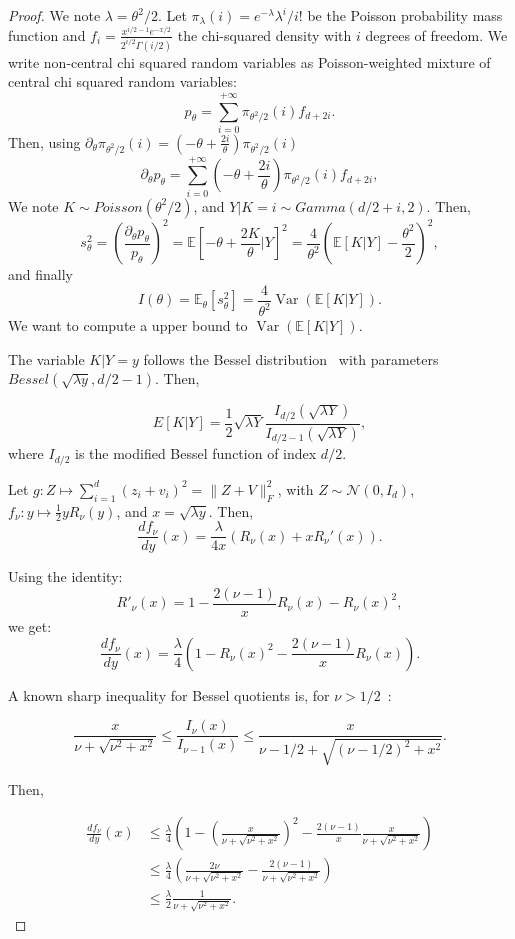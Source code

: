 \documentclass{article}
\theoremstyle{plain}
\theoremstyle{definition}
\theoremstyle{remark}
\DeclareMathOperator{\Var}{Var}
\begin{document}
\begin{proof}
    We note $\lambda = \theta^2/2$.
    Let $\pi_\lambda(i) = e^{-\lambda} \lambda^i /i!$ be the Poisson probability mass function and $f_i = \frac{x^{i/2-1} e^{-x/2}}{2^{i/2}\Gamma(i/2)}$ the chi-squared density with $i$ degrees of freedom.
    We write non-central chi squared random variables as Poisson-weighted mixture of central chi squared random variables: \[p_\theta = \sum_{i=0}^{+\infty} \pi_{\theta^2/2}(i)f_{d+2i}.\]
    Then, using $\partial_\theta \pi_{\theta^2/2}(i)= (- \theta  + \frac{2 i}{\theta} )  \pi_{\theta^2/2}(i)$
    \[\partial_\theta p_\theta = \sum_{i=0}^{+\infty} \left(- \theta  + \frac{2 i}{\theta} \right)\pi_{\theta^2/2}(i)f_{d+2i},\]
    We note $K \sim Poisson(\theta^2/2)$, and $Y | K=i\sim Gamma(d/2 + i, 2)$. Then,\[s_\theta^2 = \left(\frac{\partial_\theta p_\theta}{p_\theta}\right)^2 =\mathbb{E}\left[ -\theta + \frac{2K}{\theta} \bigg | Y \right]^2 = \frac{4}{\theta^2}\left(\mathbb{E}[K | Y] - \frac{\theta^2}{2}\right)^2,\]
    and finally
    \[I(\theta) = \mathbb{E}_\theta\left[s_\theta^2\right] = \frac{4}{\theta^2}\Var\left(\mathbb{E}[K|Y]\right).\]
    We want to compute a upper bound to $\Var(\mathbb{E}[K|Y])$. 

    The variable $K|Y = y$ follows the Bessel distribution~\citep{Yuan2000} with parameters $Bessel(\sqrt{\lambda y},d/2 -1)$. Then,

\[E[K|Y] = \frac{1}{2} \sqrt{\lambda Y} \frac{I_{d/2}(\sqrt{\lambda Y})}{I_{d/2-1}(\sqrt{\lambda Y})},\]
where $I_{d/2}$ is the modified Bessel function of index $d/2$.

Let $g : Z \mapsto \sum_{i=1}^d (z_i + v_i)^2 = \|Z+V\|_F^2$, with $Z \sim \mathcal{N}(0, I_d)$, $f_\nu : y \mapsto \frac{1}{2}yR_\nu(y)$, and $x = \sqrt{\lambda y}$. Then, \[\frac{df_\nu}{dy}(x) = \frac{\lambda}{4x}\left(R_\nu(x) + x R_\nu'(x)\right).\]

Using the identity:
\[R'_\nu(x)=1 - \frac{2(\nu-1)}{x}R_\nu(x) - R_\nu(x)^2,\]
we get:
\[\frac{df_\nu}{dy}(x) = \frac{\lambda}{4}\left(1- R_\nu(x)^2 - \frac{2(\nu-1)}{x}R_\nu(x)\right).\]

A known sharp inequality for Bessel quotients is, for $\nu > 1/2$~\citep{ruiz2016}:

\[\frac{x}{\nu + \sqrt{\nu^2 + x^2}} \leq \frac{I_{\nu}(x)}{I_{\nu-1}(x)}  \leq \frac{x}{\nu-1/2 + \sqrt{(\nu-1/2)^2 + x^2}}.\]

Then,

\begin{align*}
    \frac{df_\nu}{dy}(x) &\leq \frac{\lambda}{4}\left(1- \left(\frac{x}{\nu + \sqrt{\nu^2 + x^2}}\right)^2 - \frac{2(\nu-1)}{x}\frac{x}{\nu + \sqrt{\nu^2 + x^2}} \right)\\
    &\leq \frac{\lambda}{4 }\left(\frac{2\nu}{\nu + \sqrt{\nu^2 + x^2}} -\frac{2(\nu-1) }{\nu + \sqrt{\nu^2 + x^2}} \right)\\
    &\leq \frac{\lambda}{2}\frac{1}{\nu + \sqrt{\nu^2 + x^2}}.
\end{align*}




\end{proof}
\end{document}
